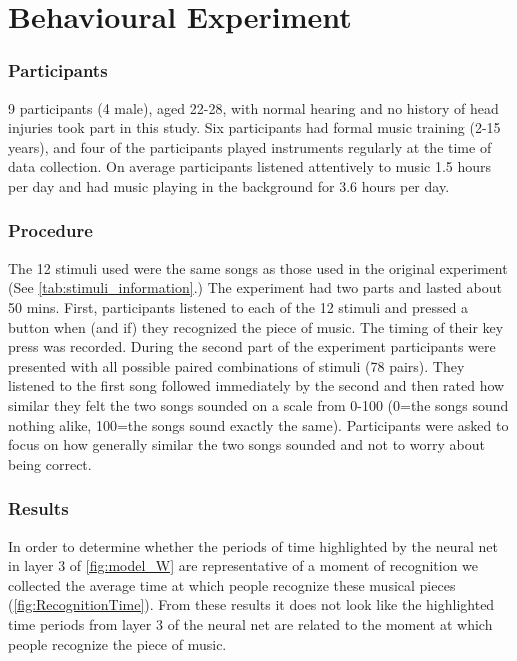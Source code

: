 \chapter*{Behavioural Experiment}
\subsection*{Participants}
9 participants (4 male), aged 22-28, with normal hearing and no history of head injuries took part in this study. 
Six participants had formal music training (2-15 years), and four of the participants played instruments regularly at the time of data collection. 
On average participants listened attentively to music 1.5 hours per day and had music playing in the background for 3.6 hours per day.
\vspace{-1em}
\subsection*{Procedure}
The 12 stimuli used were the same songs as those used in the original experiment (See \autoref{tab:stimuli_information}.)
The experiment had two parts and lasted about 50 mins.
First, participants listened to each of the 12 stimuli and pressed a button when (and if) they recognized the piece of music.
The timing of their key press was recorded. 
During the second part of the experiment participants were presented with all possible paired combinations of stimuli (78 pairs). 
They listened to the first song followed immediately by the second and then rated how similar they felt the two songs sounded on a scale from 0-100 (0=the songs sound nothing alike, 100=the songs sound exactly the same).
Participants were asked to focus on how generally similar the two songs sounded and not to worry about being correct.

\subsection*{Results}
In order to determine whether the periods of time highlighted by the neural net in layer 3 of \autoref{fig:model_W} are representative of a moment of recognition we collected the average time at which people recognize these musical pieces (\autoref{fig:RecognitionTime}). 
From these results it does not look like the highlighted time periods from layer 3 of the neural net are related to the moment at which people recognize the piece of music. 

